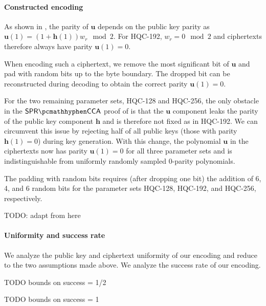 \paragraph{Constructed encoding}

As shown in \cite{EC:Xagawa22}, the parity of $\mathbf u$ depends on the public key parity as $\mathbf u(1)=(1 + \mathbf h(1))w_r \mod 2$. For HQC-192, $w_r = 0 \mod 2$ and ciphertexts therefore always have parity $\mathbf u(1)=0$.

When encoding such a ciphertext, we remove the most significant bit of $\mathbf u$ and pad with random bits up to the byte boundary. The dropped bit can be reconstructed during decoding to obtain the correct parity $\mathbf u(1)=0$.

For the two remaining parameter sets, HQC-128 and HQC-256, the only obstacle in the $\sprcca$ proof of \cite{EC:Xagawa22} is that the $\mathbf u$ component leaks the parity of the public key component $\mathbf h$ and is therefore not fixed as in HQC-192. We can circumvent this issue by rejecting half of all public keys (those with parity $\mathbf h(1)=0$) during key generation.
With this change, the polynomial $\mathbf u$ in the ciphertexts now has parity $\mathbf u(1)=0$ for all three parameter sets and is indistinguishable from uniformly randomly sampled 0-parity polynomials.

The padding with random bits requires (after dropping one bit) the addition of 6, 4, and 6 random bits for the parameter sets HQC-128, HQC-192, and HQC-256, respectively.

TODO: adapt from here

\paragraph{Uniformity and success rate}

We analyze the public key and ciphertext uniformity of our encoding and reduce to the two assumptions made above. We analyze the success rate of our encoding.

\begin{lemma}[[First-keygen Success Probability of TODO TBD]
\label{lem:hqc-first-keygen-success}
    TODO bounds on success = 1/2
\end{lemma}

\begin{lemma}[[First-encaps Success Probability of TODO TBD]
\label{lem:hqc-first-encaps-success}
    TODO bounds on success = 1
\end{lemma}

